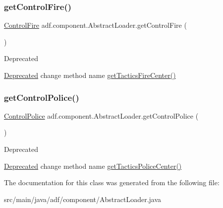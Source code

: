 \subsubsection{\texorpdfstring{get\+Control\+Fire()}{getControlFire()}}
{\footnotesize\ttfamily \hyperlink{classadf_1_1component_1_1control_1_1ControlFire}{Control\+Fire} adf.\+component.\+Abstract\+Loader.\+get\+Control\+Fire (\begin{DoxyParamCaption}{ }\end{DoxyParamCaption})}

\begin{DoxyRefDesc}{Deprecated}
\item[\hyperlink{deprecated__deprecated000007}{Deprecated}]change method name \hyperlink{}{get\+Tactics\+Fire\+Center()} \end{DoxyRefDesc}
\hypertarget{classadf_1_1component_1_1AbstractLoader_a2917adfedf677a3af006521e64996a42}{}\label{classadf_1_1component_1_1AbstractLoader_a2917adfedf677a3af006521e64996a42} 
\subsubsection{\texorpdfstring{get\+Control\+Police()}{getControlPolice()}}
{\footnotesize\ttfamily \hyperlink{classadf_1_1component_1_1control_1_1ControlPolice}{Control\+Police} adf.\+component.\+Abstract\+Loader.\+get\+Control\+Police (\begin{DoxyParamCaption}{ }\end{DoxyParamCaption})}

\begin{DoxyRefDesc}{Deprecated}
\item[\hyperlink{deprecated__deprecated000008}{Deprecated}]change method name \hyperlink{}{get\+Tactics\+Police\+Center()} \end{DoxyRefDesc}


The documentation for this class was generated from the following file\+:\begin{DoxyCompactItemize}
\item 
src/main/java/adf/component/Abstract\+Loader.\+java\end{DoxyCompactItemize}
